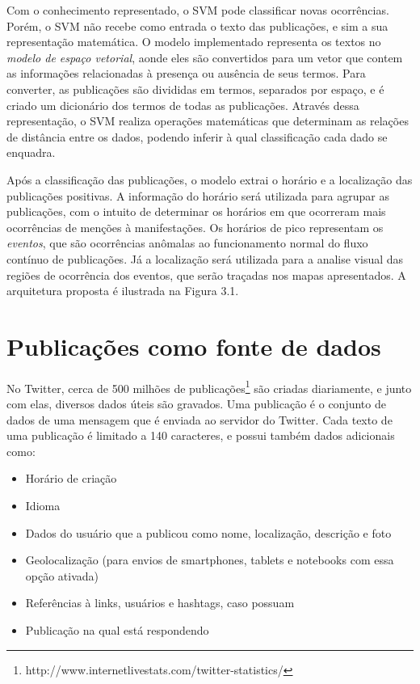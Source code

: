 Com o conhecimento representado, o SVM pode classificar novas ocorrências. Porém, o SVM não recebe como entrada o texto das publicações, e sim a sua representação matemática. O modelo implementado representa os textos no \textit{modelo de espaço vetorial}, aonde eles são convertidos para um vetor que contem as informações relacionadas à presença ou ausência de seus termos. Para converter, as publicações são divididas em termos, separados por espaço, e é criado um dicionário dos termos de todas as publicações. Através dessa representação, o SVM realiza operações matemáticas que determinam as relações de distância entre os dados, podendo inferir à qual classificação cada dado se enquadra.

Após a classificação das publicações, o modelo extrai o horário e a localização das publicações positivas. A informação do horário será utilizada para agrupar as publicações, com o intuito de determinar os horários em que ocorreram mais ocorrências de menções à manifestações. Os horários de pico representam os \textit{eventos}, que são ocorrências anômalas ao funcionamento normal do fluxo contínuo de publicações. Já a localização será utilizada para a analise visual das regiões de ocorrência dos eventos, que serão traçadas nos mapas apresentados. A arquitetura proposta é ilustrada na Figura 3.1.

\section{Publicações como fonte de dados}

No Twitter, cerca de 500 milhões de publicações\footnote{http://www.internetlivestats.com/twitter-statistics/} são criadas diariamente, e junto com elas, diversos dados úteis são gravados. Uma publicação é o conjunto de dados de uma mensagem que é enviada ao servidor do Twitter. Cada texto de uma publicação é limitado a 140 caracteres, e possui também dados adicionais como:

\begin{itemize}
	\item Horário de criação
	\item Idioma
	\item Dados do usuário que a publicou como nome, localização, descrição e foto
	\item Geolocalização (para envios de smartphones, tablets e notebooks com essa opção ativada)
	\item Referências à links, usuários e hashtags, caso possuam
	\item Publicação na qual está respondendo 
\end{itemize}

